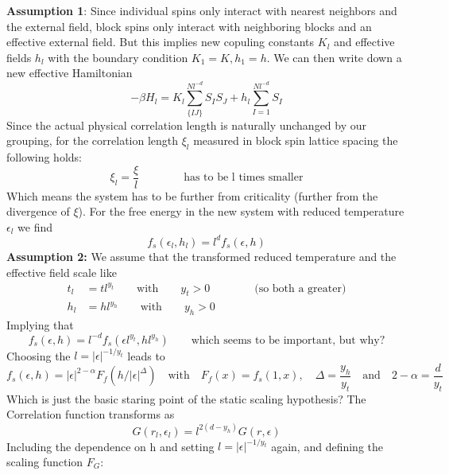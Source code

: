 	\textbf{Assumption 1}: Since individual spins only interact with nearest neighbors and the external field, block spins only interact with neighboring blocks and an effective external field. But this implies new copuling constants $K_l$ and effective fields $h_l$ with the boundary condition $K_1 = K, h_1 =	h$. We can then write down a new effective Hamiltonian
	\begin{equation}
		-\beta H_l =	K_l \sum_{\lbrace IJ\rbrace}^{Nl^{-d}} S_I S_J + h_l \sum_{I=1}^{Nl^{-d}}S_I
	\end{equation}
	Since the actual physical correlation length is naturally unchanged by our grouping, for the correlation length $\xi_l$ measured in block spin lattice spacing the following holds:
	\begin{equation}
		\xi_l =	\frac{\xi}{l} \qquad \qquad \text{has to be l times smaller}
	\end{equation}
	Which means the system has to be further from criticality (further from the divergence of $\xi$). For the free energy in the new system with reduced temperature $\epsilon_l$ we find
	\begin{equation}
		f_s(\epsilon_l, h_l) =	l^d f_s(\epsilon, h)
	\end{equation}
	\textbf{Assumption 2:} We assume that the transformed reduced temperature and the effective field scale like
	\begin{align}
		t_l &=	t l^{y_t} \qquad \text{with} \qquad y_t > 0  \qquad \qquad \text{(so both a greater)}\\
		h_l &= h l^{y_h} \qquad \text{with} \qquad y_h > 0
	\end{align}
	Implying that
	\begin{equation}
		f_s(\epsilon, h) =	l^{-d} f_s(\epsilon l^{y_t}, h l^{y_h} ) \qquad \text{which seems to be important, but why?}
	\end{equation}
	Choosing the $l =	|\epsilon|^{-1/y_t}$ leads to
	\begin{equation}
		f_s(\epsilon, h) =	|\epsilon|^{2-\alpha} F_f(h / |\epsilon|^\Delta) \quad \text{with} \quad F_f(x) =f_s(1, x), \quad \Delta = \frac{y_h}{y_t} \quad \text{and} \quad 2-\alpha =	\frac{d}{y_t}
	\end{equation}
	Which is just the basic staring point of the static scaling hypothesis?
	The Correlation function transforms as
	\begin{equation}
		G(r_l, \epsilon_l) =	l^{2(d-y_h)} G(r,\epsilon)
	\end{equation}
	Including the dependence on h and setting $l =	|\epsilon|^{-1/y_t}$ again, and defining the scaling function $F_G$:
